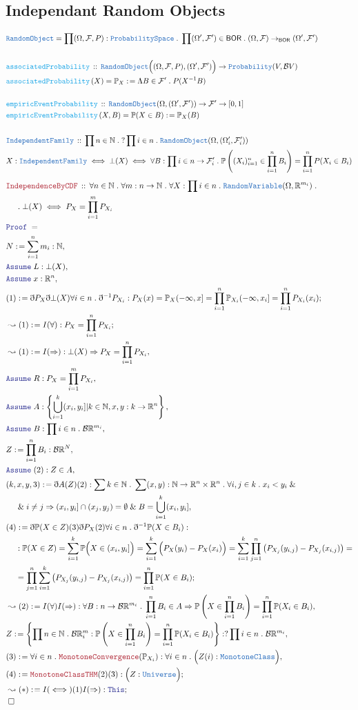 \documentclass[12pt]{scrartcl}
\newcommand{\TYPE}[1]{\textcolor{NavyBlue}{\mathtt{#1}}}
\newcommand{\FUNC}[1]{\textcolor{Cerulean}{\mathtt{#1}}}
\newcommand{\LOGIC}[1]{\textcolor{Blue}{\mathtt{#1}}}
\newcommand{\THM}[1]{\textcolor{Maroon}{\mathtt{#1}}}
\renewcommand{\.}{\; . \;}
\newcommand{\de}{: \kern 0.1pc =}
\newcommand{\Act}[1]{\left( #1 \right)}
\newcommand{\Theorem}[2]{& \THM{#1} \, :: \, #2 \\ & \Proof = \\ }
\newcommand{\DeclareType}[2]{& \TYPE{#1} \, :: \, #2 \\}
\newcommand{\DefineNamedType}[4]{& #1 : \TYPE{#2} \iff #3 \iff #4 \\}
\newcommand{\DeclareFunc}[2]{& \FUNC{#1} \, :: \, #2 \\}
\newcommand{\DefineNamedFunc}[4]{&  \FUNC{#1}\Act{#2} = #3 \de #4 \\}
\newcommand{\NewLine}{\\ & \kern 1pc}
\newcommand{\Page}[1]{\begin{align*} #1 \end{align*}   }
\newcommand{ \bd }{ \ByDef }
\renewcommand{\And}{\; \& \;}
\newcommand{\Reals}{\mathbb{R} }
\newcommand{\Nat}{\mathbb{N} }
\newcommand{\Say}[3]{& #1 \de #2 : #3, \\}
\newcommand{\Conclude}[3]{& #1 \de #2 : #3; \\}
\newcommand{\Derive}[3]{& \leadsto #1 \de #2 : #3, \\}
\newcommand{\DeriveConclude}[3]{& \leadsto #1 \de #2 : #3 ; \\}
\newcommand{\A}{\LOGIC{Assume} \;}
\newcommand{\Assume}[2]{& \A #1 : #2, \\}
\newcommand{\QED}{\; \square}
\newcommand{\EndProof}{& \QED \\}
\newcommand{\ByDef}{\eth}
\newcommand{\Proof}{\LOGIC{Proof} \; }
\newcommand{\BOR}{\mathsf{BOR}}
\newcommand{\F}{\mathcal{F}}
\renewcommand{\O}{\Omega}
\newcommand{\B}{\mathcal{B}}
\renewcommand{\P}{\mathbb{P}}
\newcommand{\RV}{\TYPE{RandomVariable}}
\newcommand{\RO}{\TYPE{RandomObject}}
\begin{document}
\subsection{Independant Random Objects}
\Page{
	& \RO  = \prod (\O,\F,P) : \TYPE{ProbabilitySpace} \. \prod (\O',\F') \in \BOR  \.  (\O,\F) \to_\BOR (\O',\F') \\ 
	\\
	\DeclareFunc{associatedProbability}{ \RO\Big( (\O,\F,P), (\O',\F') \Big) \to \TYPE{Probability}(V,\B V)  }
	\DefineNamedFunc{associatedProbability}{X}{\P_X}{\Lambda B \in \F' \.  P(X^{-1}B) }
	\\
	\DeclareFunc{empiricEventProbability}{\RO ( \O , (\O',\F')  ) \to \F' \to [0,1]}
	\DefineNamedFunc{empiricEventProbability}{X,B}{ \P(X \in B)  }{\P_X(B)}
	\\
	\DeclareType{IndependentFamily}{\prod n \in \Nat \. ? \prod i \in n \. \RO(\O,(\O_i',\F_i'))}
	\DefineNamedType{X}{IndependentFamily}{\bot(X)}{ \forall B : \prod i \in n \to \F_i' \. \P \left( (X_i)^n_{i = 1} \in \prod^n_{i = 1} B_i  \right) = \prod^n_{i = 1} P(X_i \in B_i)  }
}\Page{
	\Theorem{IndependenceByCDF}{ \forall n \in \Nat \. \forall m : n \to \Nat \.  \forall X : \prod i \in n \. \RV(\O,\Reals^{m_i}) \.
		\NewLine
		\. \bot(X) \iff P_X = \prod^m_{i = 1} P_{X_i} 
	}
	\Say{N}{\sum^n_{i=1} m_i}{\Nat}
	\Assume{L}{\bot(X)}
	\Assume{x}{\Reals^n}
	\Conclude{(1)}{ \bd P_X \bd \bot(X) \forall i \in n \. \bd^{-1} P_{X_i}    }{ P_X(x) = \P_X(-\infty,x] = \prod^n_{i=1} \P_{X_i}(-\infty,x_i]  = \prod^n_{i=1} P_{X_i}(x_i)  }
	\DeriveConclude{(1)}{I(\forall)}{ P_X = \prod^n_{i = 1} P_{X_i}}
	\Derive{(1)}{I(\Rightarrow)}{ \bot(X) \Rightarrow P_X = \prod^n_{i = 1} P_{X_i}}
	\Assume{R}{P_X = \prod^m_{i = 1} P_{X_i}}
	\Assume{A}{ \left\{  \bigcup^k_{i = 1} ( x_i, y_i] | k \in \Nat,  x,y : k \to \Reals^n    \right\} }
	\Assume{B}{\prod i \in n \. \B \Reals^{m_i}}
	\Say{Z}{\prod^n_{i=1} B_i}{ \B \Reals^N  }
	\Assume{(2)}{Z \in A}
	\Say{(k,x,y,3)}{\bd A(Z)(2)}{\sum k \in \Nat \. \sum (x,y) : \Nat \to \Reals^n \times \Reals^n \. \forall i,j \in k \. x_i < y_i \And 
	\NewLine \And
	i \neq j
	\Rightarrow
	(x_i,y_i] \cap (x_j,y_j) = \emptyset \And B = \bigcup^k_{i=1} (x_i,y_i]}
	\Conclude{(4)}{ \bd \P(X \in Z)(3)\bd P_X (2) \forall i \in n \. \bd^{-1}\P(X \in B_i)   }{
		\NewLine :
		\P(X \in Z) = 
		\sum^k_{i=1} \P\Big( X \in (x_i,y_i] \Big) =
		\sum^k_{i=1} \Big(P_{X}(y_i) - P_X(x_i)\Big) =
		\sum^k_{i=1} \prod^n_{j = 1}\left(  P_{X_j}(y_{i,j}) - P_{X_j}(x_{i,j}) \right)=
		\NewLine
		=\prod^n_{j=1} \sum^k_{i=1} \left( P_{X_j}(y_{i,j}) - P_{X_j}(x_{i,j})  \right) =
		\prod^n_{i = 1} \P(X \in B_i)  
	} 
	\Derive{(2)}{I(\forall)I(\Rightarrow)}{\forall B : n \to \B \Reals^{m_i} \. \prod^n_{i=1} B_i \in A \Rightarrow \P\left(X \in \prod^n_{i=1} B_i\right) = \prod^n_{i=1}\P(X_i \in B_i) }
	\Say{Z}{\left\{ \prod n \in \Nat \. \B \Reals^m_i : \P\left(X \in \prod^n_{i=1} B_i \right) = \prod^n_{i=1} \P( X_i \in B_i )  \right\}}{ ? \prod i \in n \. \B \Reals^{m_i}}
	\Say{(3)}{\forall i \in n \. \THM{MonotoneConvergence}(\P_{X_i})}{\forall i \in n \. \Big( Z(i) : \TYPE{MonotoneClass} \Big)}
	\Conclude{(4)}{\THM{MonotoneClassTHM}(2)(3)}{ \Big( Z : \TYPE{Universe} \Big)}
	\DeriveConclude{(*)}{I(\iff)(1)I(\Rightarrow)}{ \LOGIC{This} }
	\EndProof
}
\end{document}
